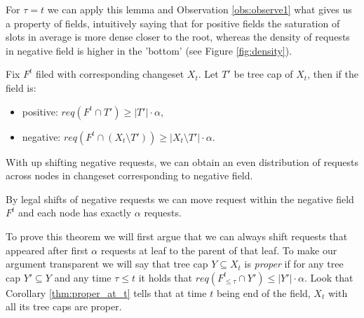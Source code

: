 For $\tau = t$ we can apply this lemma and Observation \ref{obs:observe1} 
what gives us a property of fields, intuitively saying that for positive 
fields the saturation of slots in average is more dense closer to 
the root, whereas the density of requests in negative field is higher in the 
'bottom' (see Figure \ref{fig:density}).
\begin{corollary}
Fix $F^t$ filed with corresponding changeset $X_t$. Let $T'$ be tree cap of 
$X_t$, then if the field is:
 \begin{itemize}
  \item positive: $req(F^t \cap T') \geq |T'| \cdot \alpha$,
  \item negative: $req(F^t \cap (X_t \setminus T')) \geq |X_t \setminus 
T'| \cdot \alpha$.
 \end{itemize}
 \label{thm:proper_at_t}
\end{corollary}

With up shifting negative requests, we can obtain an even distribution of 
requests across nodes in changeset corresponding to negative field.
\begin{theorem}
By legal shifts of negative requests we can move request within the 
negative field $F^t$ 
and each node has exactly $\alpha$ requests.
\label{thm:legal_shifting_up}
\end{theorem}
To prove this theorem we will first argue that we can always 
shift requests that appeared after first $\alpha$ requests at leaf to the 
parent of that leaf. To make our argument transparent we will say that tree 
cap $Y 
\subseteq X_t$ is \textit{proper} if for any tree cap $Y' \subseteq Y$ and any 
time $\tau \leq t$ it holds that $req(F^t_{\leq \tau} \cap Y') \leq |Y'| \cdot 
\alpha$. Look that Corollary \ref{thm:proper_at_t} tells that at time $t$ 
being end of the field, 
$X_t$ with all its tree caps are proper.

